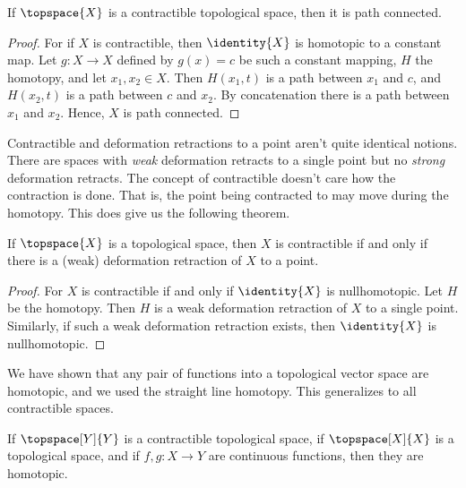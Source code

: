 \documentclass{book}                                                           %
\begin{document}
                \begin{theorem}
                    If $\topspace{X}$ is a contractible topological space, then
                    it is path connected.
                \end{theorem}
                \begin{proof}
                    For if $X$ is contractible, then $\identity{X}$ is homotopic
                    to a constant map. Let $g:X\rightarrow{X}$ defined by
                    $g(x)=c$ be such a constant mapping, $H$ the homotopy, and
                    let $x_{1},x_{2}\in{X}$. Then $H(x_{1},t)$ is a path between
                    $x_{1}$ and $c$, and $H(x_{2},t)$ is a path between
                    $c$ and $x_{2}$. By concatenation there is a path between
                    $x_{1}$ and $x_{2}$. Hence, $X$ is path connected.
                \end{proof}
                Contractible and deformation retractions to a point aren't quite
                identical notions. There are spaces with \textit{weak}
                deformation retracts to a single point but no \textit{strong}
                deformation retracts. The concept of contractible doesn't care
                how the contraction is done. That is, the point being contracted
                to may move during the homotopy. This does give us the following
                theorem.
                \begin{theorem}
                    If $\topspace{X}$ is a topological space, then $X$ is
                    contractible if and only if there is a (weak) deformation
                    retraction of $X$ to a point.
                \end{theorem}
                \begin{proof}
                    For $X$ is contractible if and only if $\identity{X}$ is
                    nullhomotopic. Let $H$ be the homotopy. Then $H$ is a
                    weak deformation retraction of $X$ to a single point.
                    Similarly, if such a weak deformation retraction exists,
                    then $\identity{X}$ is nullhomotopic.
                \end{proof}
                We have shown that any pair of functions into a topological
                vector space are homotopic, and we used the straight line
                homotopy. This generalizes to all contractible spaces.
                \begin{theorem}
                    If $\topspace[Y]{Y}$ is a contractible topological space, if
                    $\topspace[X]{X}$ is a topological space, and if
                    $f,g:X\rightarrow{Y}$ are continuous functions, then they
                    are homotopic.
                \end{theorem}
\end{document}
